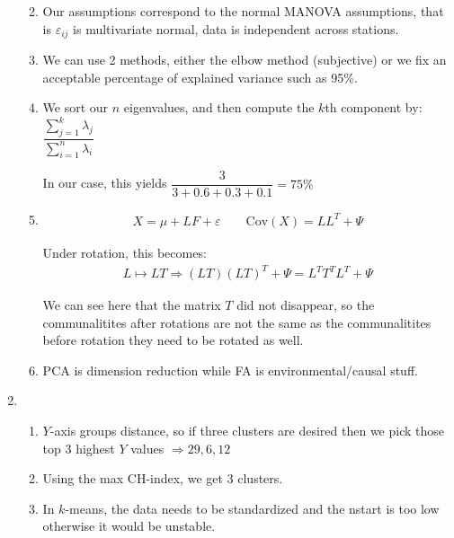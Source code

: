 \begin{enumerate}[label=\arabic*., leftmargin=*]
\begin{enumerate}[label=\alph*),leftmargin=*]
    \par\bigskip
  \item Our assumptions correspond to the normal MANOVA assumptions, that is $\varepsilon_{ij}$ is multivariate normal, data is independent across stations.
    \par\bigskip
  \item We can use 2 methods, either the elbow method (subjective) or we fix an acceptable percentage of explained variance such as 95\%.
    \par\bigskip
  \item We sort our $n$ eigenvalues, and then compute the $k$th component by: $\dfrac{\sum_{j=1}^{k}\lambda_j}{\sum_{i=1}^{n}\lambda_i}$\par
    \noindent In our case, this yields $\dfrac{3}{3+0.6+0.3+0.1} = 75\%$
    \par\bigskip
  \item
    \begin{equation*}
      \begin{gathered}
        X = \mu+LF+\varepsilon\qquad \text{Cov}\left(X\right) = LL^T+\Psi
      \end{gathered}
    \end{equation*}
    \par\bigskip
    \noindent Under rotation, this becomes:
    \begin{equation*}
      \begin{gathered}
        L\mapsto LT
        \Rightarrow (LT)(LT)^T+\Psi = L^TT^TL^T+\Psi
      \end{gathered}
    \end{equation*}
    \par\bigskip
    \noindent We can see here that the matrix $T$ did not disappear, so the communalitites after rotations are not the same as the communalitites before rotation they need to be rotated as well. 
    \par\bigskip
  \item PCA is dimension reduction while FA is environmental/causal stuff.
  \end{enumerate}
  \par\bigskip
  \item 
  \begin{enumerate}[label=\alph*),leftmargin=*]
    \item $Y$-axis groups distance, so if three clusters are desired then we pick those top 3 highest $Y$ values $\Rightarrow 29,6,12$
      \par\bigskip
    \item Using the max CH-index, we get 3 clusters.
      \par\bigskip
    \item In $k$-means, the data needs to be standardized and the nstart is too low otherwise it would be unstable.
  \end{enumerate}
\end{enumerate}
